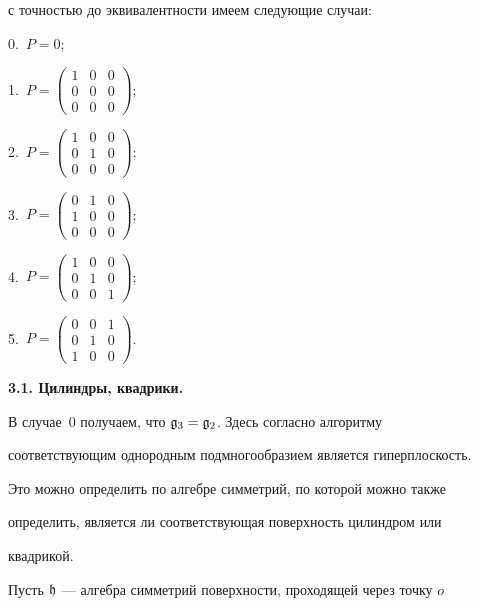 с точностью до эквивалентности имеем следующие случаи:


0.~$P=0$;


1.~$P=\left


(\begin{smallmatrix} 1 & 0&0\\0 & 0&0\\ 0&0&0\end{smallmatrix}\right)$;


2.~$P=\left


(\begin{smallmatrix} 1 & 0&0\\0 & 1&0\\ 0&0&0\end{smallmatrix}\right)$;


3.~$P=\left


(\begin{smallmatrix} 0 & 1&0\\1 & 0&0\\ 0&0&0\end{smallmatrix}\right)$;


4.~$P=\left


(\begin{smallmatrix} 1 & 0&0\\0 & 1&0\\ 0&0&1\end{smallmatrix}\right)$;


5.~$P=\left


(\begin{smallmatrix} 0 & 0&1\\0 & 1&0\\ 1&0&0\end{smallmatrix}\right)$.


\medskip





{\bf 3.1. Цилиндры, квадрики.}


В случае~0 получаем, что $\frak g_3=\frak g_2$. Здесь согласно алгоритму


соответствующим однородным подмногообразием является гиперплоскость.


Это можно определить по алгебре симметрий, по которой можно также


определить, является ли соответствующая поверхность цилиндром или


квадрикой.





Пусть $\frak h$ --- алгебра симметрий поверхности, проходящей через точку $o$


